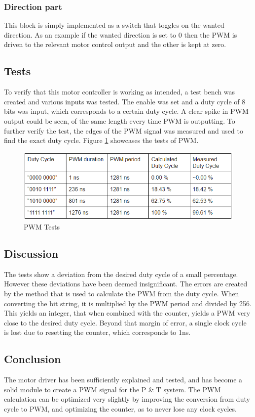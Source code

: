 \subsubsection{Direction part}

This block is simply implemented as a switch that toggles on the wanted direction. As an example if the wanted direction is set to 0 then the PWM is driven to the relevant motor control output and the other is kept at zero.

\subsection{Tests}

To verify that this motor controller is working as intended, a test bench was created and various inputs was tested. The enable was set and a duty cycle of 8 bits was input, which corresponds to a certain duty cycle. A clear spike in PWM output could be seen, of the same length every time PWM is outputting.
To further verify the test, the edges of the PWM signal was measured and used to find the exact duty cycle. Figure \ref{fig:MotorDriverTable} showcases the tests of PWM.

\begin{figure}[h!]
	\centering
	\includegraphics[scale=0.8]{Billeder/MotorDriverTabe.png}
	\caption{ PWM Tests }
	\label{fig:MotorDriverTable}
\end{figure}

\subsection{Discussion}

The tests show a deviation from the desired duty cycle of a small percentage. However these deviations have been deemed insignificant. The errors are created by the method that is used to calculate the PWM from the duty cycle. When converting the bit string, it is multiplied by the PWM period and divided by 256. This yields an integer, that when combined with the counter, yields a PWM very close to the desired duty cycle. Beyond that margin of error, a single clock cycle is lost due to resetting the counter, which corresponds to 1ns.


\subsection{Conclusion}

The motor driver has been sufficiently explained and tested, and has become a solid module to create a PWM signal for the P \& T system. The PWM calculation can be optimized very slightly by improving the conversion from duty cycle to PWM, and optimizing the counter, as to never lose any clock cycles.
